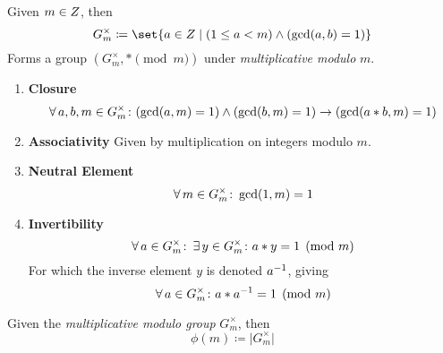 \begin{definition}
    Given $m \in \relax{Z}$, then
    \begin{equation}
        G^{\times}_{m} \coloneqq \set{a \in \Int \mid (1 \le a < m) \land (\gcd(a, b) = 1)}
    \end{equation}
    Forms a group $\left( G^{\times}_{m}, \ast \pmod{m} \right)$ under \textit{multiplicative modulo} $m$.
    
    \begin{enumerate}
        \item \textbf{Closure}
        \begin{equation}
            \operatorname{\forall} a, b, m \in G^{\times}_{m} \colon 
                (\gcd(a, m) = 1) \land (\gcd(b, m) = 1) \to (\gcd(a \ast b, m) = 1)
        \end{equation}
        \item \textbf{Associativity}
            \subitem Given by multiplication on integers modulo $m$.
        \item \textbf{Neutral Element}
        \begin{equation}
            \operatorname{\forall} m \in G^{\times}_{m} \colon \gcd(1, m) = 1
        \end{equation}
        \item \textbf{Invertibility}
        \begin{equation}
            \operatorname{\forall} a \in G^{\times}_{m} \colon \operatorname{\exists} y \in G^{\times}_{m} \colon a \ast y = 1 \pmod{m}
        \end{equation}
        For which the inverse element $y$ is denoted ${a}^{-1}$, giving
        \begin{equation}
            \operatorname{\forall} a \in G^{\times}_{m} \colon a \ast {a}^{-1} = 1 \pmod{m}
        \end{equation}
    \end{enumerate}
\end{definition}

\begin{theorem}[Euler]
    Given the \textit{multiplicative modulo group} $G^{\times}_{m}$, then
    \begin{equation}
        \phi(m) \coloneqq \lvert G^{\times}_{m} \rvert
    \end{equation}
\end{theorem}
